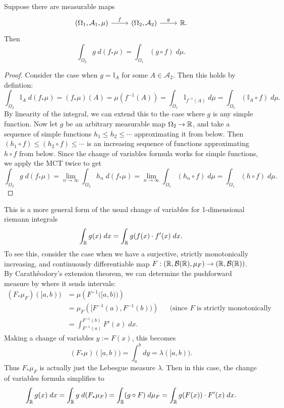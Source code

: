 \documentclass[twoside,10pt]{article}
\begin{document}
\begin{thrm}
Suppose there are measurable maps
\[
	\begin{tikzcd}
        {(\Omega_1, \mathcal{A}_{1}, \mu)} & {(\Omega_2, \mathcal{A}_{2})} & {\R}.
        \arrow["f", from=1-1, to=1-2]
        \arrow["g", from=1-2, to=1-3]
	\end{tikzcd}
\]
Then
\[
\int_{\Omega_2} g\;d(f_{*}\mu) = \int_{\Omega_1} (g \circ f)\; d\mu.
\] 
\end{thrm}
\begin{proof}
	Consider the case when $g = \mathbb{I}_{A}$ for some $A \in \mathcal{A}_{2}$. Then this holds by defintion:
	\[
	\int_{\Omega_2} \mathbb{I}_{A}\;d(f_{*}\mu) = (f_{*}\mu)(A) = \mu(f^{-1}(A)) = \int_{\Omega_1} \mathbb{I}_{f^{-1}(A)}\;d\mu = \int_{\Omega_1} (\mathbb{I}_{A} \circ f) \; d\mu.
	\] By linearity of the integral, we can extend this to the case where $g$ is any simple function. Now let $g$ be an arbitrary measurable map $\Omega_2\to \mathbb{R}$, and take a sequence of simple functions $h_1 \leq h_2 \leq \cdots$ approximating it from below. Then $(h_1 \circ f) \leq (h_2 \circ f) \leq \cdots$ is an increasing sequence of functions approximating $h \circ f$ from below. Since the change of variables formula works for simple functions, we apply the MCT twice to get
	\[
	\int_{\Omega_2} g \; d(f_{*}\mu) = \lim_{n \to \infty} \int_{\Omega_2} h_{n}\;d(f_{*}\mu) = \lim_{n \to \infty} \int_{\Omega_1} (h_{n} \circ f)\;d\mu = \int_{\Omega_1} (h\circ f)\;d\mu.
	\] 
\end{proof}
This is a more general form of the usual change of variables for 1-dimensional riemann integrals
\[
\int_{\mathbb{R}} g(x)\;dx = \int_{\mathbb{R}} g(f(x) \cdot f'(x)\;dx.	
\] 
To see this, consider the case when we have a surjective, strictly monotonically increasing, and continuously differentiable map $F : (\mathbb{R}, \mathcal{B}(\mathbb{R}), \mu_{F}) \to (\mathbb{R}, \mathcal{B}(\mathbb{R}))$. By Carath\^eodory's extension theorem, we can determine the pushforward measure by where it sends intervals:
\begin{align*}
	(F_{*}\mu_{F})([a,b)) &= \mu\left( F^{-1}\big( [a,b) \big) \right) \\
			      &= \mu_{F}\left( \big[ F^{-1}(a), F^{-1}(b) \big) \right) && \text{(since $F$ is strictly monotonically increasing)} \\
			      &= \int_{F^{-1}(a)}^{F^{-1}(b)} F'(x)\;dx.
\end{align*}
Making a change of variables $y := F(x)$, this becomes
\[
	(F_{*}\mu)([a,b)) = \int_{a}^{b} dy = \lambda([a,b)).
\] Thus $F_{*}\mu_{F}$ is actually just the Lebesgue measure $\lambda$. Then in this case, the change of variables formula simplifies to
\[
\int_{\mathbb{R}} g(x)\;dx = \int_{\mathbb{R}} g\;d(F_{*}\mu_{F}) = \int_{\mathbb{R}} (g\circ F)\;d\mu_{F} = \int_{\mathbb{R}} g(F(x)) \cdot F'(x)\;dx.
\] 
\end{document}
